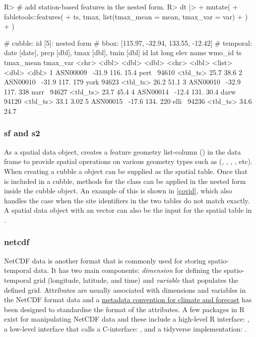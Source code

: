 \documentclass[
]{jss}
\begin{document}
\begin{CodeChunk}
\begin{CodeInput}
R> # add station-based features in the nested form.
R> dt |> 
+   mutate(
+     fabletools::features(
+       ts, tmax, list(tmax_mean = mean, tmax_var = var)
+       )
+   )
\end{CodeInput}
\begin{CodeOutput}
# cubble:   id [5]: nested form
# bbox:     [115.97, -32.94, 133.55, -12.42]
# temporal: date [date], prcp [dbl], tmax [dbl], tmin [dbl]
  id          lat  long  elev name  wmo_id ts       tmax_mean tmax_var
  <chr>     <dbl> <dbl> <dbl> <chr>  <dbl> <list>       <dbl>    <dbl>
1 ASN00009~ -31.9  116.  15.4 pert~  94610 <tbl_ts>      25.7    38.6 
2 ASN00010~ -31.9  117. 179   york   94623 <tbl_ts>      26.2    51.1 
3 ASN00010~ -32.9  117. 338   narr~  94627 <tbl_ts>      23.7    45.4 
4 ASN00014~ -12.4  131.  30.4 darw~  94120 <tbl_ts>      33.1     3.02
5 ASN00015~ -17.6  134. 220   elli~  94236 <tbl_ts>      34.6    24.7 
\end{CodeOutput}
\end{CodeChunk}

\hypertarget{sf-and-s2}{%
\subsubsection{sf and s2}\label{sf-and-s2}}

As a spatial data object,  creates a feature geometry list-column () in the data frame to provide spatial operations on various geometry types such as (, , , , etc). When creating a cubble a  object can be supplied as the spatial table. Once that is included in a cubble, methods for the  class can be applied in the nested form inside the cubble object. An example of this is shown in \ref{covid}, which also handles the case when the site identifiers in the two tables do not match exactly. A spatial data object with an  vector can also be the input for the spatial table in .

\hypertarget{netcdf}{%
\subsubsection{netcdf}\label{netcdf}}

NetCDF data is another format that is commonly used for storing spatio-temporal data. It has two main components: \emph{dimension} for defining the spatio-temporal grid (longitude, latitude, and time) and \emph{variable} that populates the defined grid. Attributes are usually associated with dimensions and variables in the NetCDF format data and a \href{http://cfconventions.org/}{metadata convention for climate and forecast} has been designed to standardise the format of the attributes. A few packages in R exist for manipulating NetCDF data and these include a high-level R interface:  \citep{ncdf4}, a low-level interface that calls a C-interface:  \citep{rnetcdf, michna2013rnetcdf}, and a tidyverse implementation:  \citep{tidync}.
\end{document}

